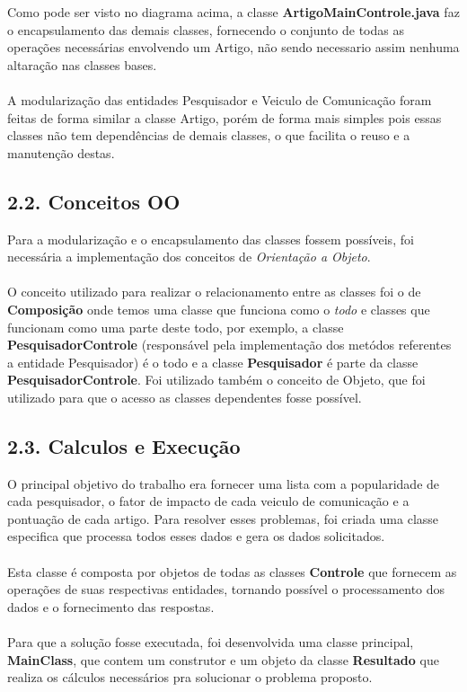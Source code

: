 \documentclass[12pt, a4paper]{article}
\begin{document}
  Como pode ser visto no diagrama acima, a classe \textbf{ArtigoMainControle.java} faz o encapsulamento das demais classes, fornecendo o conjunto de todas as operações necessárias envolvendo um Artigo, não sendo necessario assim nenhuma altaração nas classes bases.\\\\
  A modularização das entidades Pesquisador e Veiculo de Comunicação foram feitas de forma similar a classe Artigo, porém de forma mais simples pois essas classes não tem dependências de demais classes, o que facilita o reuso e a manutenção destas.

  \subsection*{2.2. Conceitos OO}
    Para a modularização e o encapsulamento das classes fossem possíveis, foi necessária a implementação dos conceitos de \textit{Orientação a Objeto}.\\\\
    O conceito utilizado para realizar o relacionamento entre as classes foi o de \textbf{Composição} onde temos uma classe que funciona como o \textit{todo} e classes que funcionam como uma parte deste todo, por exemplo, a classe \textbf{PesquisadorControle} (responsável pela implementação dos metódos referentes a entidade Pesquisador) é o todo e a classe \textbf{Pesquisador} é parte da classe \textbf{PesquisadorControle}.
    Foi utilizado também o conceito de Objeto, que foi utilizado para que o acesso as classes dependentes fosse possível.

  \subsection*{2.3. Calculos e Execução}
    O principal objetivo do trabalho era fornecer uma lista com a popularidade de cada pesquisador, o fator de impacto de cada veiculo de comunicação e a pontuação de cada artigo. Para resolver esses problemas, foi criada uma classe especifica que processa todos esses dados e gera os dados solicitados.\\\\
    Esta classe é composta por objetos de todas as classes \textbf{Controle} que fornecem as operações de suas respectivas entidades, tornando possível o processamento dos dados e o fornecimento das respostas.\\\\
    Para que a solução fosse executada, foi desenvolvida uma classe principal, \textbf{MainClass}, que contem um construtor e um objeto da classe \textbf{Resultado} que realiza os cálculos necessários pra solucionar o problema proposto.
\end{document}
